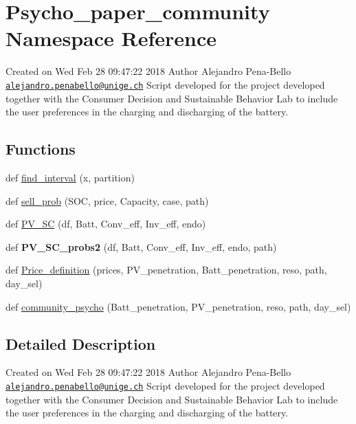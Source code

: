 \hypertarget{namespace_psycho__paper__community}{}\section{Psycho\+\_\+paper\+\_\+community Namespace Reference}
\label{namespace_psycho__paper__community}


Created on Wed Feb 28 09\+:47\+:22 2018 Author Alejandro Pena-\/\+Bello \href{mailto:alejandro.penabello@unige.ch}{\tt alejandro.\+penabello@unige.\+ch} Script developed for the project developed together with the Consumer Decision and Sustainable Behavior Lab to include the user preferences in the charging and discharging of the battery.  


\subsection*{Functions}
\begin{DoxyCompactItemize}
\item 
def \mbox{\hyperlink{namespace_psycho__paper__community_a281baf6a407d30a22e485f5f76a62c3c}{find\+\_\+interval}} (x, partition)
\item 
def \mbox{\hyperlink{namespace_psycho__paper__community_a3e0bea6729bebaf15916a97fbf15e5ee}{sell\+\_\+prob}} (S\+OC, price, Capacity, case, path)
\item 
def \mbox{\hyperlink{namespace_psycho__paper__community_abefde718373bb160a718d8db9cd371b8}{P\+V\+\_\+\+SC}} (df, Batt, Conv\+\_\+eff, Inv\+\_\+eff, endo)
\item 
\mbox{\label{namespace_psycho__paper__community_ad44c65eda4460f8930299994447872ee}} 
def {\bfseries P\+V\+\_\+\+S\+C\+\_\+probs2} (df, Batt, Conv\+\_\+eff, Inv\+\_\+eff, endo, path)
\item 
def \mbox{\hyperlink{namespace_psycho__paper__community_a55c0842aa06303ca13fb7c4124534a18}{Price\+\_\+definition}} (prices, P\+V\+\_\+penetration, Batt\+\_\+penetration, reso, path, day\+\_\+sel)
\item 
def \mbox{\hyperlink{namespace_psycho__paper__community_a40671524b3288de32169be3816854d27}{community\+\_\+psycho}} (Batt\+\_\+penetration, P\+V\+\_\+penetration, reso, path, day\+\_\+sel)
\end{DoxyCompactItemize}


\subsection{Detailed Description}
Created on Wed Feb 28 09\+:47\+:22 2018 Author Alejandro Pena-\/\+Bello \href{mailto:alejandro.penabello@unige.ch}{\tt alejandro.\+penabello@unige.\+ch} Script developed for the project developed together with the Consumer Decision and Sustainable Behavior Lab to include the user preferences in the charging and discharging of the battery. 

